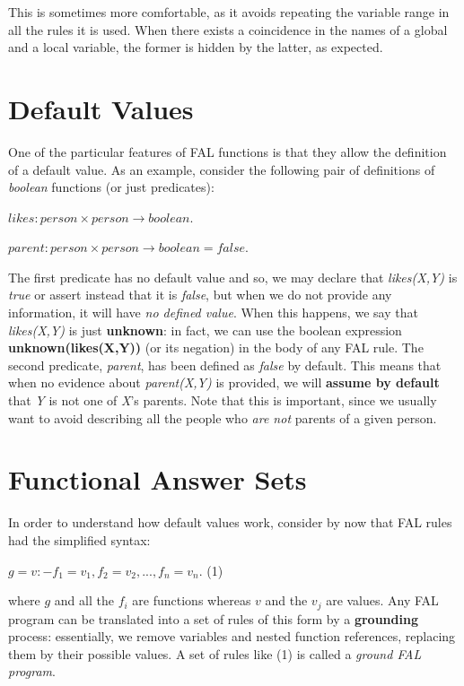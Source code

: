 \documentclass[a4paper,12pt]{report}
\begin{document}
This is sometimes more comfortable, as it avoids repeating the variable range in all the rules it is used. When there exists a coincidence in the names of a global and a local variable, the former is hidden by the latter, as expected.

\section{Default Values}

One of the particular features of FAL functions is that they allow the definition of a default value. As an example, consider the following pair of definitions of \textit{boolean} functions (or just predicates):

\begin{addmargin}
$likes: person \times  person \rightarrow boolean.$

$parent: person \times person \rightarrow boolean = false.$
\end{addmargin}

The first predicate has no default value and so, we may declare that \textit{likes(X,Y)} is \textit{true} or assert instead that it is \textit{false}, but when we do not provide any information, it will have \textit{no defined value}. When this happens, we say that \textit{likes(X,Y)} is just \textbf{unknown}: in fact, we can use the boolean expression \textbf{unknown(likes(X,Y))} (or its negation) in the body of any FAL rule. The second predicate, \textit{parent}, has been defined as \textit{false} by default. This means that when no evidence about \textit{parent(X,Y)} is provided, we will \textbf{assume by default} that \textit{Y} is not one of \textit{X}'s parents. Note that this is important, since we usually want to avoid describing all the people who \textit{are not} parents of a given person.

\section{Functional Answer Sets}
In order to understand how default values work, consider by now that FAL rules had the simplified syntax:

\begin{addmargin}
$g=v :- f_1=v_1 , f_2=v_2 , ..., f_n=v_n. $ (1)
\end{addmargin}

where $g$ and all the $f_i$ are functions whereas $v$ and the $v_j$ are values. Any FAL program can be translated into a set of rules of this form by a \textbf{grounding} process: essentially, we remove variables and nested function references, replacing them by their possible values. A set of rules like (1) is called a\textit{ ground FAL program}.
\end{document}
